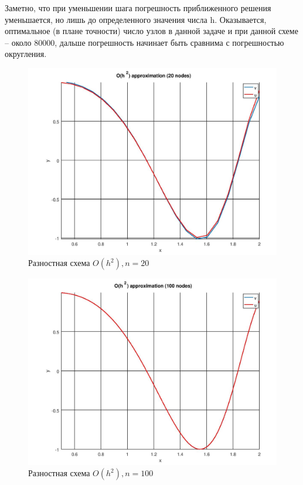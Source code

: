\documentclass[12pt]{article}
\begin{document}
Заметно, что при уменьшении шага погрешность приближенного решения уменьшается, но лишь до определенного значения числа h. Оказывается, оптимальное (в плане точности) число узлов в данной задаче и при данной схеме – около 80000, дальше погрешность начинает быть сравнима с погрешностью округления.

\begin{figure}
\begin{center}
\includegraphics[scale = 0.65]{h2_20.jpg} 
\end{center}
\caption{Разностная схема $O(h^2), n = 20$ }
\end{figure}

\begin{figure}
\begin{center}
\includegraphics[scale = 0.65]{h2_100.jpg} 
\end{center}
\caption{Разностная схема $O(h^2), n = 100$ }
\end{figure}
\end{document}
